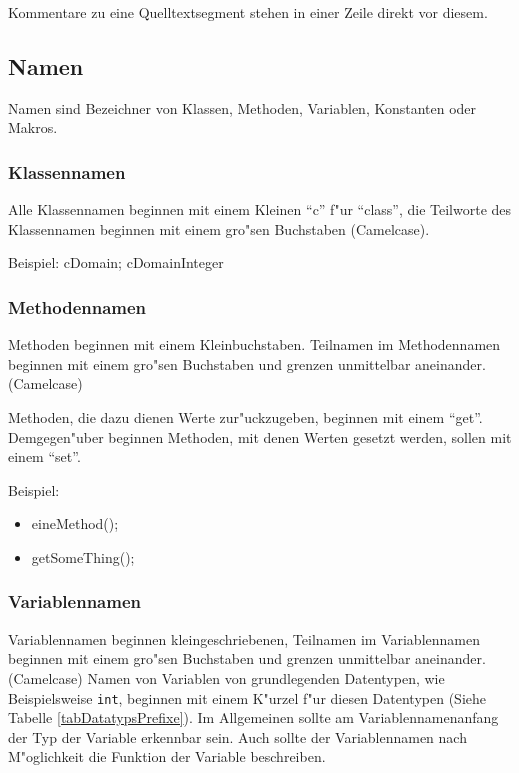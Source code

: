 Kommentare zu eine Quelltextsegment stehen in einer Zeile direkt vor diesem.


\subsection{Namen}

Namen sind Bezeichner von Klassen, Methoden, Variablen, Konstanten oder Makros.


\subsubsection{Klassennamen}

Alle Klassennamen beginnen mit einem Kleinen "`c"' f"ur "`class"', die Teilworte des Klassennamen beginnen mit einem gro"sen Buchstaben
(Camelcase).

\noindent
Beispiel: cDomain; cDomainInteger


\subsubsection{Methodennamen}

Methoden beginnen mit einem Kleinbuchstaben. Teilnamen im Methodennamen beginnen mit einem gro"sen Buchstaben und grenzen unmittelbar aneinander. (Camelcase)

Methoden, die dazu dienen Werte zur"uckzugeben, beginnen mit einem "`get"'. Demgegen"uber beginnen Methoden, mit denen Werten gesetzt werden, sollen mit einem "`set"'.

\noindent
Beispiel:
\begin{itemize}
 \item eineMethod();
 \item getSomeThing();
\end{itemize}


\subsubsection{Variablennamen}

Variablennamen beginnen kleingeschriebenen, Teilnamen im Variablennamen beginnen mit einem gro"sen Buchstaben und grenzen unmittelbar aneinander. (Camelcase) Namen von Variablen von grundlegenden Datentypen, wie Beispielsweise \texttt{int}, beginnen mit einem K"urzel f"ur diesen Datentypen (Siehe Tabelle \ref{tabDatatypsPrefixe}). Im Allgemeinen sollte am Variablennamenanfang der Typ der Variable erkennbar sein. Auch sollte der Variablennamen nach M"oglichkeit die Funktion der Variable beschreiben.

